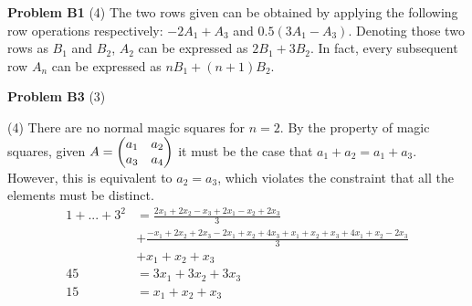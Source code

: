 \documentclass[12pt]{article}
\begin{document}
\vspace {0.25cm} \noindent
{\bf Problem B1}
(4)
The two rows given can be obtained by applying the following row operations respectively: 
$-2A_1+A_3$ and $0.5(3A_1 - A_3)$. Denoting those two rows as $B_1$ and $B_2$, 
$A_2$ can be expressed as $2B_1 + 3B_2$. In fact, every subsequent row $A_n$ can be 
expressed as $nB_1 + (n+1)B_2$. 

\vspace {0.25cm} \noindent
{\bf Problem B3}
(3)

(4)
There are no normal magic squares for $n=2$. By the property of magic squares, given 
$A = \begin{pmatrix}
  a_1 & a_2\cr a_3 & a_4
\end{pmatrix}$
it must be the case that $a_1 + a_2 = a_1 + a_3$. However, this is equivalent to $a_2 = a_3$, 
which violates the constraint that all the elements must be distinct.
\begin{align*}
  1 + ... + 3^2 &= \frac{2x_1 + 2x_2 - x_3 + 2x_1 - x_2 + 2x_3}{3} \\
  &+ \frac{-x_1 + 2x_2 + 2x_3 - 2x_1 + x_2 + 4x_3 + x_1 + x_2 + x_3 + 4x_1 + x_2 - 2x_3}{3}\\
  &+ x_1 + x_2 + x_3\\
  45 &= 3x_1 + 3 x_2 + 3x_3\\
  15 &= x_1 + x_2 + x_3
\end{align*}
\end{document}
